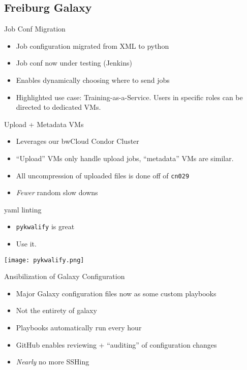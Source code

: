 \documentclass[12pt]{ufrslides}
\begin{document}
\subsection{Freiburg Galaxy}
	\begin{frame}{Job Conf Migration}
		\begin{itemize}
			\item Job configuration migrated from XML to python
			\item Job conf now under testing (Jenkins)
			\item Enables dynamically choosing where to send jobs
			\item Highlighted use case: Training-as-a-Service. Users in specific roles can be directed to dedicated VMs.
		\end{itemize}
	\end{frame}

	\begin{frame}{Upload + Metadata VMs}
		\begin{itemize}
			\item Leverages our bwCloud Condor Cluster
			\item ``Upload'' VMs only handle upload jobs, ``metadata'' VMs are similar.
			\item All uncompression of uploaded files is done off of \texttt{cn029}
			\item \emph{Fewer} random slow downs
		\end{itemize}
	\end{frame}

	\begin{frame}{yaml linting}
		\begin{itemize}
			\item \texttt{pykwalify} is great
			\item Use it.
		\end{itemize}
		\texttt{[image: pykwalify.png]}
	\end{frame}

	\begin{frame}{Ansibilization of Galaxy Configuration}
		\begin{itemize}
			\item Major Galaxy configuration files now as some custom playbooks
			\item Not the entirety of galaxy
			\item Playbooks automatically run every hour
			\item GitHub enables reviewing + ``auditing'' of configuration changes
			\item \emph{Nearly} no more SSHing
		\end{itemize}
	\end{frame}
\end{document}
